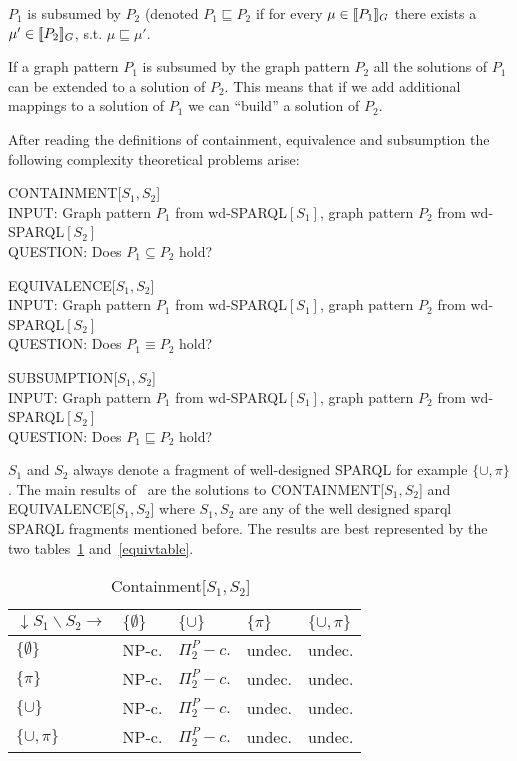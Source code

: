 \begin{definition}[Subsumption]
\medskip\noindent $P_1$ is subsumed by $P_2$ (denoted $P_1 \sqsubseteq P_2$ if for every $\mu \in \llbracket P_1 \rrbracket_G$ there exists a $\mu' \in
\llbracket P_2 \rrbracket_G$, s.t. $\mu \sqsubseteq \mu'$. 
\end{definition}
If a graph pattern $P_1$ is subsumed by the graph pattern $P_2$ all the
solutions of $P_1$ can be extended to a solution of $P_2$. This means that if we
add additional mappings to a solution of $P_1$ we can ``build'' a solution of
$P_2$. 


\noindent After reading the definitions of containment, equivalence and
subsumption the following complexity theoretical problems arise:\\
\begin{framed}\noindent CONTAINMENT[$S_1,S_2$]\\
	INPUT: Graph pattern $P_1$ from wd-SPARQL$[S_1]$,
		 graph pattern $P_2$ from wd-SPARQL$[S_2]$\\
	QUESTION: Does $P_1 \subseteq P_2$ hold?
\end{framed}
\begin{framed}\noindent EQUIVALENCE[$S_1,S_2$]\\
	INPUT: Graph pattern $P_1$ from wd-SPARQL$[S_1]$,
		 graph pattern $P_2$ from wd-SPARQL$[S_2]$\\
	QUESTION: Does $P_1 \equiv P_2$ hold?
\end{framed}
\begin{framed}\noindent SUBSUMPTION[$S_1,S_2$]\\
	INPUT: Graph pattern $P_1$ from wd-SPARQL$[S_1]$,
		 graph pattern $P_2$ from wd-SPARQL$[S_2]$\\
	QUESTION: Does $P_1 \sqsubseteq P_2$ hold?
\end{framed}
$S_1$ and $S_2$ always denote a fragment of well-designed SPARQL for example
$\{\cup,\pi\}$. The main results of~\cite{pichler2014containment} are the
solutions to CONTAINMENT[$S_1,S_2$] and EQUIVALENCE[$S_1,S_2$] where $S_1,S_2$
are any of the well designed sparql SPARQL fragments mentioned before.
The results are best represented by the two
tables~\ref{conttable} and~\ref{equivtable}.

\begin{table}
	\begin{minipage}[b]{0.5\hsize}
		\begin{tabular}{|l | l | l | l | l|}
			\hline
			$\downarrow S_1 \backslash S_2 \rightarrow$ & $\{\emptyset\}$  &
			$\{\cup\}$& $\{\pi \}$ & $\{\cup,\pi \}$ \\
			\hline
			$\{\emptyset\}$           & NP-c.	& $\Pi^P_2-c.$  & undec. & undec. \\
			$\{\pi \}$       & NP-c.	& $\Pi^P_2-c.$  & undec. & undec. \\
			$\{\cup \}$      & NP-c.	& $\Pi^P_2-c.$  & undec. & undec. \\
			$\{\cup,\pi \}$ & NP-c.	& $\Pi^P_2-c.$  & undec. & undec. \\
			\hline
		\end{tabular}
		\caption{Containment[$S_1,S_2$]~\cite{pichler2014containment}}
		\label{conttable}
	\end{minipage}
\end{table}

